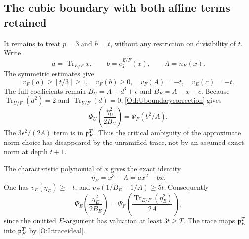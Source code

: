 \documentclass[11pt]{amsart}
\theoremstyle{definition}
\theoremstyle{remark}
\newcommand{\Tr}{\operatorname{Tr}}
\newcommand{\ceil}[1]{\left\lceil #1\right\rceil}
\begin{document}
\subsection{The cubic boundary with both affine terms retained}
It remains to treat $p=3$ and $h=t$, without any restriction on divisibility
of $t$. Write
\[
 a=\Tr_{E/F}x,\qquad b=e_2^{E/F}(x),\qquad A=n_E(x).
\]
The symmetric estimates give
\begin{equation}\label{O:I:cubicbounds}
 v_F(a)\ge\ceil{t/3}\ge1,\quad v_F(b)\ge0,
 \quad v_F(A)=-t,\quad v_E(x)=-t.
\end{equation}
The full coefficients remain $B_U=A+d^3+\epsilon$ and
$B_E=A-x+c$.
Because $\Tr_{U/F}(d^2)=2$ and $\Tr_{U/F}(d)=0$,
\eqref{O:I:Uboundarycorrection} gives
\begin{equation}\label{O:I:cubicU}
 \Psi_U\!\left(\frac{\eta_U^2}{2B_U}\right)=\Psi_F(b^2/A).
\end{equation}
The $3\epsilon^2/(2A)$ term is in $\mathfrak p_F^T$. Thus the critical ambiguity
of the approximate norm choice has disappeared by the unramified trace,
not by an assumed exact norm at depth $t+1$.

The characteristic polynomial of $x$ gives the exact identity
\begin{equation}\label{O:I:cubiceta}
 \eta_E=x^3-A=a x^2-bx.
\end{equation}
One has $v_E(\eta_E)\ge-t$, and
$v_E(1/B_E-1/A)\ge5t$. Consequently
\begin{equation}\label{O:I:cubicE}
 \Psi_E\!\left(\frac{\eta_E^2}{2B_E}\right)
 =\Psi_F\!\left(\frac{\Tr_{E/F}(\eta_E^2)}{2A}\right),
\end{equation}
since the omitted $E$-argument has valuation at least $3t\ge T$.
The trace maps $\mathfrak p_E^T$ into $\mathfrak p_F^T$ by \eqref{O:I:traceideal}.
\end{document}
